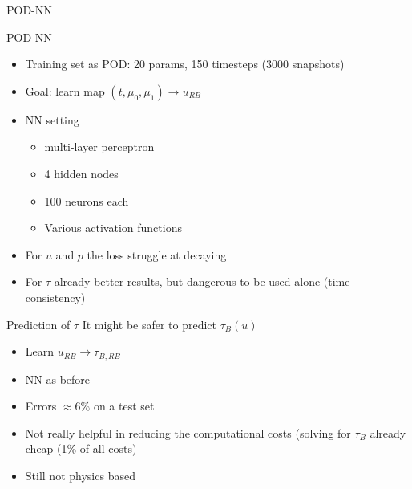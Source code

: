 \documentclass[9pt,compress,t,aspectratio=169]{beamer}
\newcommand{\1}{\begin{pmatrix}
		1\\
		1
\end{pmatrix}}
\begin{document}
\begin{frame}[noframenumbering]{POD-NN}
	\begin{minipage}{0.49\textwidth}
		\begin{block}{POD-NN}
			\begin{itemize}
				\item Training set as POD: 20 params, 150 timesteps (3000 snapshots)
				\item Goal: learn map $(t,\mu_0,\mu_1)\to u_{RB}$
				\item NN setting 
				\begin{itemize}
					\item multi-layer perceptron 
					\item 4 hidden nodes 
					\item 100 neurons each
					\item Various activation functions
				\end{itemize}
				\item For $u$ and $p$ the loss struggle at decaying
				\item For $\tau$ already better results, but dangerous to be used alone (time consistency)
			\end{itemize}
		\end{block}
	\end{minipage}\hfill
	\begin{minipage}{0.49\textwidth}
		\begin{block}{Prediction of $\tau$}
			It might be safer to predict $\tau_B(u)$
			\begin{itemize}
				\item Learn $u_{RB}\to \tau_{B,RB}$
				\item NN as before
				\item Errors $\approx 6\%$ on a test set
				\item Not really helpful in reducing the computational costs (solving for $\tau_B$ already cheap (1\% of all costs)
				\item Still not physics based
			\end{itemize}
		\end{block}
	\end{minipage}
\end{frame}
\end{document}
